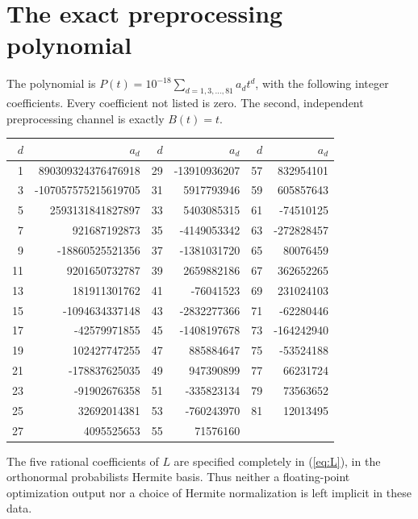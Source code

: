 \section{The exact preprocessing polynomial}\label{app:polynomial}
The polynomial is $P(t)=10^{-18}\sum_{d=1,3,\ldots,81}a_dt^d$, with
the following integer coefficients. Every coefficient not listed is zero.
The second, independent preprocessing channel is exactly $B(t)=t$.
\begin{center}
\small
\begin{tabular}{rr@{\qquad}rr@{\qquad}rr}
\toprule
$d$ & $a_d$ & $d$ & $a_d$ & $d$ & $a_d$ \\
\midrule
1 & 890309324376476918 & 29 & -13910936207 & 57 & 832954101 \\
3 & -107057575215619705 & 31 & 5917793946 & 59 & 605857643 \\
5 & 2593131841827897 & 33 & 5403085315 & 61 & -74510125 \\
7 & 921687192873 & 35 & -4149053342 & 63 & -272828457 \\
9 & -18860525521356 & 37 & -1381031720 & 65 & 80076459 \\
11 & 9201650732787 & 39 & 2659882186 & 67 & 362652265 \\
13 & 181911301762 & 41 & -76041523 & 69 & 231024103 \\
15 & -1094634337148 & 43 & -2832277366 & 71 & -62280446 \\
17 & -42579971855 & 45 & -1408197678 & 73 & -164242940 \\
19 & 102427747255 & 47 & 885884647 & 75 & -53524188 \\
21 & -178837625035 & 49 & 947390899 & 77 & 66231724 \\
23 & -91902676358 & 51 & -335823134 & 79 & 73563652 \\
25 & 32692014381 & 53 & -760243970 & 81 & 12013495 \\
27 & 4095525653 & 55 & 71576160 &  &  \\
\bottomrule
\end{tabular}
\end{center}
The five rational coefficients of $L$ are specified completely in
(\ref{eq:L}), in the orthonormal probabilists\textquotesingle{} Hermite basis.
Thus neither a floating-point optimization output nor a choice of Hermite
normalization is left implicit in these data.
